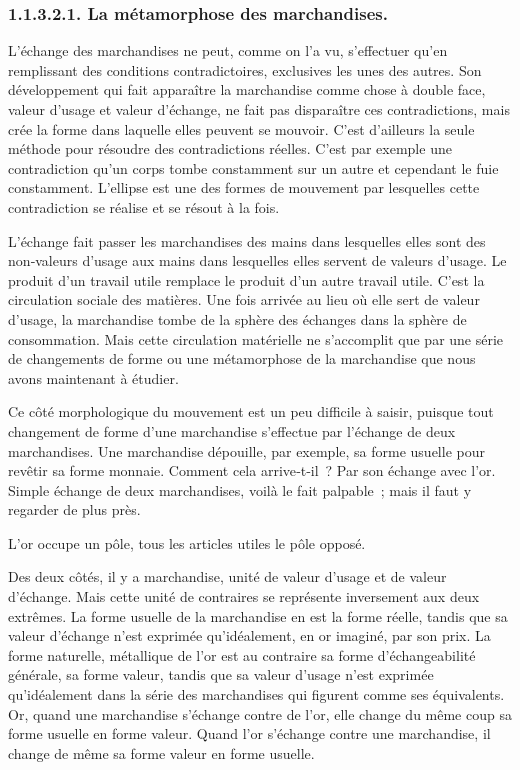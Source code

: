 \documentclass[french,twoside]{book} %
\begin{document}
\subsubsection[{1.1.3.2.1. La métamorphose des marchandises.}]{1.1.3.2.1. La métamorphose des marchandises.}
\noindent L’échange des marchandises ne peut, comme on l’a vu, s’effectuer qu’en remplissant des conditions contradictoires, exclusives les unes des autres. Son développement qui fait apparaître la marchandise comme chose à double face, valeur d’usage et valeur d’échange, ne fait pas disparaître ces contradictions, mais crée la forme dans laquelle elles peuvent se mouvoir. C’est d’ailleurs la seule méthode pour résoudre des contradictions réelles. C’est par exemple une contradiction qu’un corps tombe constamment sur un autre et cependant le fuie constamment. L’ellipse est une des formes de mouvement par lesquelles cette contradiction se réalise et se résout à la fois.\par
L’échange fait passer les marchandises des mains dans lesquelles elles sont des non‑valeurs d’usage aux mains dans lesquelles elles servent de valeurs d’usage. Le produit d’un travail utile remplace le produit d’un autre travail utile. C’est la circulation sociale des matières. Une fois arrivée au lieu où elle sert de valeur d’usage, la marchandise tombe de la sphère des échanges dans la sphère de consommation. Mais cette circulation matérielle ne s’accomplit que par une série de changements de forme ou une métamorphose de la marchandise que nous avons maintenant à étudier.\par
Ce côté morphologique du mouvement est un peu difficile à saisir, puisque tout changement de forme d’une marchandise s’effectue par l’échange de deux marchandises. Une marchandise dépouille, par exemple, sa forme usuelle pour revêtir sa forme monnaie. Comment cela arrive‑t‑il ? Par son échange avec l’or. Simple échange de deux marchandises, voilà le fait palpable ; mais il faut y regarder de plus près.\par
L’or occupe un pôle, tous les articles utiles le pôle opposé.\par
Des deux côtés, il y a marchandise, unité de valeur d’usage et de valeur d’échange. Mais cette unité de contraires se représente inversement aux deux extrêmes. La forme usuelle de la marchandise en est la forme réelle, tandis que sa valeur d’échange n’est exprimée qu’idéalement, en or imaginé, par son prix. La forme naturelle, métallique de l’or est au contraire sa forme d’échangeabilité générale, sa forme valeur, tandis que sa valeur d’usage n’est exprimée qu’idéalement dans la série des marchandises qui figurent comme ses équivalents. Or, quand une marchandise s’échange contre de l’or, elle change du même coup sa forme usuelle en forme valeur. Quand l’or s’échange contre une marchandise, il change de même sa forme valeur en forme usuelle.\par
\end{document}
